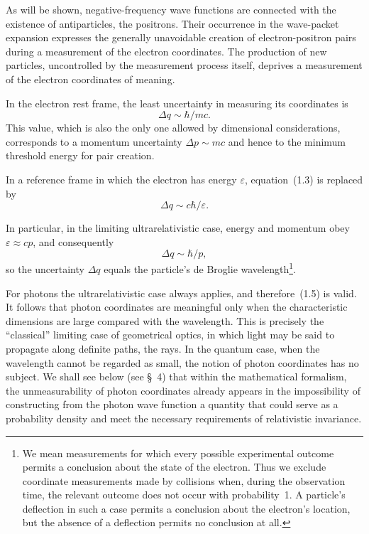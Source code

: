As will be shown, negative-frequency wave functions are connected with the existence of antiparticles, the positrons. Their occurrence in the wave-packet expansion expresses the generally unavoidable creation of electron-positron pairs during a measurement of the electron coordinates. The production of new particles, uncontrolled by the measurement process itself, deprives a measurement of the electron coordinates of meaning.

In the electron rest frame, the least uncertainty in measuring its coordinates is
\begin{equation}
\Delta q \sim \hbar/mc.
\tag{1.3}
\end{equation}
This value, which is also the only one allowed by dimensional considerations, corresponds to a momentum uncertainty $\Delta p \sim mc$ and hence to the minimum threshold energy for pair creation.

In a reference frame in which the electron has energy $\varepsilon$, equation~(1.3) is replaced by
\begin{equation}
\Delta q \sim c\hbar/\varepsilon.
\tag{1.4}
\end{equation}

In particular, in the limiting ultrarelativistic case, energy and momentum obey $\varepsilon \approx cp$, and consequently
\begin{equation}
\Delta q \sim \hbar/p,
\tag{1.5}
\end{equation}
so the uncertainty $\Delta q$ equals the particle's de Broglie wavelength\footnote{We mean measurements for which every possible experimental outcome permits a conclusion about the state of the electron. Thus we exclude coordinate measurements made by collisions when, during the observation time, the relevant outcome does not occur with probability~1. A particle's deflection in such a case permits a conclusion about the electron's location, but the absence of a deflection permits no conclusion at all.}.

For photons the ultrarelativistic case always applies, and therefore~(1.5) is valid. It follows that photon coordinates are meaningful only when the characteristic dimensions are large compared with the wavelength. This is precisely the ``classical'' limiting case of geometrical optics, in which light may be said to propagate along definite paths, the rays. In the quantum case, when the wavelength cannot be regarded as small, the notion of photon coordinates has no subject. We shall see below (see \S~4) that within the mathematical formalism, the unmeasurability of photon coordinates already appears in the impossibility of constructing from the photon wave function a quantity that could serve as a probability density and meet the necessary requirements of relativistic invariance.

